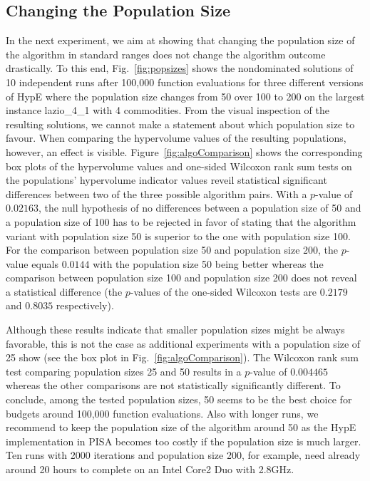 \documentclass[preprint,12pt]{elsarticle}
\begin{document}
\subsection{Changing the Population Size}
In the next experiment, we aim at showing that changing the population size of the algorithm in standard ranges does not change the algorithm outcome drastically. To this end, Fig.~\ref{fig:popsizes} shows the nondominated solutions of 10 independent runs after 100,000 function evaluations for three different versions of HypE where the population size changes from 50 over 100 to 200 on the largest instance lazio\_4\_1 with 4 commodities. From the visual inspection of the resulting solutions, we cannot make a statement about which population size to favour. When comparing the hypervolume values of the resulting populations, however, an effect is visible. Figure~\ref{fig:algoComparison} shows the corresponding box plots of the hypervolume values and one-sided Wilcoxon rank sum tests on the populations' hypervolume indicator values reveil statistical significant differences between two of the three possible algorithm pairs. With a $p$-value of $0.02163$, the null hypothesis of no differences between a population size of 50 and a population size of 100 has to be rejected in favor of stating that the algorithm variant with population size 50 is superior to the one with population size 100. For the comparison between population size 50 and population size 200, the $p$-value equals $0.0144$ with the population size 50 being better whereas the comparison between population size 100 and population size 200 does not reveal a statistical difference (the $p$-values of the one-sided Wilcoxon tests are $0.2179$ and $0.8035$ respectively). 

Although these results indicate that smaller population sizes might be always favorable, this is not the case as additional experiments with a population size of 25 show (see the box plot in Fig.~\ref{fig:algoComparison}). The Wilcoxon rank sum test comparing population sizes 25 and 50 results in a $p$-value of $0.004465$ whereas the other comparisons are not statistically significantly different. To conclude, among the tested population sizes, 50 seems to be the best choice for budgets around 100,000 function evaluations. Also with longer runs, we recommend to keep the population size of the algorithm around 50 as the HypE implementation in PISA becomes too costly if the population size is much larger. Ten runs with 2000 iterations and population size 200, for example, need already around 20 hours to complete on an Intel Core2 Duo with 2.8GHz.
\end{document}
